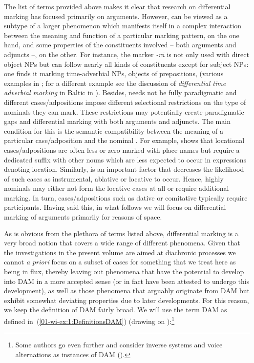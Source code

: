 \documentclass[output=paper]{LSP/langsci}
\begin{document}
The list of terms provided above makes it clear that research on differential marking has focused primarily on arguments. 
However,  can be viewed as a subtype of a larger phenomenon which manifests itself in a complex interaction between the meaning and function of a particular marking pattern, on the one hand, and some properties of the constituents involved – both arguments and adjuncts –, on the other. 
For instance, the  marker \textit{-rā} is not only used with direct object NPs but can follow nearly all kinds of constituents except for subject NPs: one finds it marking time-adverbial NPs, objects of prepositions, \etc (\cf various examples in \citealt{Dabir-Moghaddam1992Independence}; for a different example see the discussion of \textit{differential time adverbial marking} in Baltic in \citealt[141--154]{Serzant2016Nominative}). 
Besides,  needs not be fully paradigmatic and different cases/adpositions impose different selectional restrictions on the type of nominals they can mark. 
These restrictions may potentially create paradigmatic gaps and differential marking with both arguments and adjuncts. 
The main condition for this is the semantic compatibility between the meaning of a particular case/adposition and the nominal \citep{Comrie1986Markedness, Aristar1997Marking, Creisselsetal2011Animacy}. 
For example, \citet{Aristar1997Marking} shows that locational cases/adpositions are often less or zero marked with place names but require a dedicated suffix with other nouns which are less expected to occur in expressions denoting location. 
Similarly,  is an important factor that decreases the likelihood of such cases as instrumental, ablative or locative to occur. 
Hence, highly  nominals may either not form the locative cases at all or require additional marking. 
In turn, cases/adpositions such as dative or comitative typically require  participants. Having said this, in what follows we will focus on differential marking of arguments primarily for reasons of space.

As is obvious from the plethora of terms listed above, differential marking is a very broad notion that covers a wide range of different phenomena. 
Given that the investigations in the present volume are aimed at diachronic processes we cannot \textit{a priori} focus on a subset of cases for something that we treat here as being in flux, thereby leaving out phenomena that have the potential to develop into DAM in a more accepted sense (or in fact have been attested to undergo this development), as well as those phenomena that arguably originate from DAM but exhibit somewhat deviating properties due to later developments. 
For this reason, we keep the definition of DAM fairly broad. 
We will use the term DAM as defined in~(\ref{01-wi-ex:1:DefinitionsDAM}) (drawing on \citealt{Woolford2008Differential, Iemmoloetal2012Differential}):\footnote{Some authors go even further and consider inverse systems and voice alternations as instances of DAM (\eg \citealt[1]{deHoopetal2008Cross-linguistic}).}
 
\end{document}
